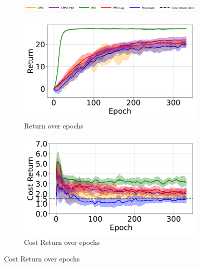 \begin{figure}[H]
    \centering

    \begin{subfigure}{1.0\textwidth}
        \centering
        \includegraphics[width=\linewidth]{figure/PointGoal/limit 2/legend_common.pdf}
    \end{subfigure}

    \vspace{0.5em} %


    \begin{minipage}{0.48\textwidth}
        \centering
        \begin{subfigure}{\linewidth}
            \centering
            \includegraphics[width=\linewidth]{figure/PointGoal/limit 1.5/EpRet.pdf}
            \caption{Return over epochs}
        \end{subfigure}

        \begin{subfigure}{\linewidth}
            \centering
            \includegraphics[width=\linewidth]{figure/PointGoal/limit 1.5/EpCost.pdf}
            \caption{Cost Return over epochs}
        \end{subfigure}


\end{minipage}
\end{figure}
